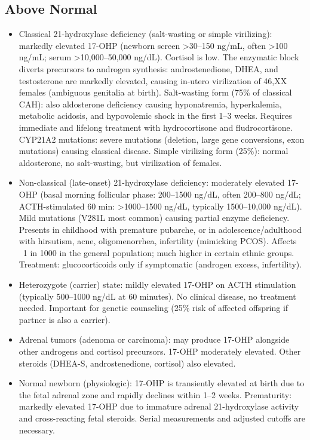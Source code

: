 \subsection*{Above Normal}
\begin{itemize}
  \item Classical 21-hydroxylase deficiency (salt-wasting or simple virilizing): markedly elevated 17-OHP (newborn screen >30--150 ng/mL, often >100 ng/mL; serum >10,000--50,000 ng/dL). Cortisol is low. The enzymatic block diverts precursors to androgen synthesis: androstenedione, DHEA, and testosterone are markedly elevated, causing in-utero virilization of 46,XX females (ambiguous genitalia at birth). Salt-wasting form (75\% of classical CAH): also aldosterone deficiency causing hyponatremia, hyperkalemia, metabolic acidosis, and hypovolemic shock in the first 1--3 weeks. Requires immediate and lifelong treatment with hydrocortisone and fludrocortisone. CYP21A2 mutations: severe mutations (deletion, large gene conversions, exon mutations) causing classical disease. Simple virilizing form (25\%): normal aldosterone, no salt-wasting, but virilization of females.
  \item Non-classical (late-onset) 21-hydroxylase deficiency: moderately elevated 17-OHP (basal morning follicular phase: 200--1500 ng/dL, often 200--800 ng/dL; ACTH-stimulated 60 min: >1000--1500 ng/dL, typically 1500--10,000 ng/dL). Mild mutations (V281L most common) causing partial enzyme deficiency. Presents in childhood with premature pubarche, or in adolescence/adulthood with hirsutism, acne, oligomenorrhea, infertility (mimicking PCOS). Affects ~1 in 1000 in the general population; much higher in certain ethnic groups. Treatment: glucocorticoids only if symptomatic (androgen excess, infertility).
  \item Heterozygote (carrier) state: mildly elevated 17-OHP on ACTH stimulation (typically 500--1000 ng/dL at 60 minutes). No clinical disease, no treatment needed. Important for genetic counseling (25\% risk of affected offspring if partner is also a carrier).
  \item Adrenal tumors (adenoma or carcinoma): may produce 17-OHP alongside other androgens and cortisol precursors. 17-OHP moderately elevated. Other steroids (DHEA-S, androstenedione, cortisol) also elevated.
  \item Normal newborn (physiologic): 17-OHP is transiently elevated at birth due to the fetal adrenal zone and rapidly declines within 1--2 weeks. Prematurity: markedly elevated 17-OHP due to immature adrenal 21-hydroxylase activity and cross-reacting fetal steroids. Serial measurements and adjusted cutoffs are necessary.

\end{itemize}
